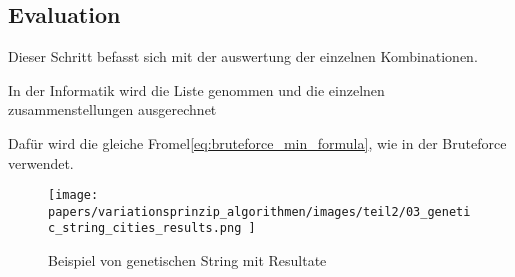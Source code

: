 %
%
%
%
\subsection{Evaluation
\label{genetic_algorithm:evaluation}}
Dieser Schritt befasst sich mit der auswertung der einzelnen 
Kombinationen.

In der Informatik wird die Liste genommen und die einzelnen 
zusammenstellungen ausgerechnet

Dafür wird die gleiche Fromel\ref{eq:bruteforce_min_formula}, 
wie in der Bruteforce verwendet.

\begin{figure} [h]
	\centering
	\texttt{[image: 
        papers/variationsprinzip\_algorithmen/images/teil2/03\_genetic\_string\_cities\_results.png
        ]}
	\caption{Beispiel von genetischen String mit Resultate}
	\label{fig:cities_genetic_string_results}
\end{figure}

